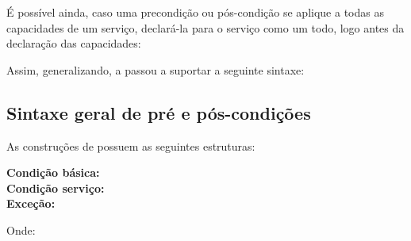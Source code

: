 É possível ainda, caso uma precondição ou pós-condição se aplique a todas as
capacidades de um serviço, declará-la para o serviço como um todo,
logo antes da declaração das capacidades:

\begin{center}
\begin{footnotesize}
\end{footnotesize}
\end{center}

 Assim, generalizando, a \neoidl{} passou a suportar a seguinte sintaxe:
 
\begin{center}
\begin{footnotesize}
\end{footnotesize}
\end{center}
 

\subsection{Sintaxe geral de pré e pós-condições}
\label{TiposContrDbC}

As construções de \designbycontract{} possuem as
seguintes estruturas:

\begin{center}
\begin{footnotesize}
\textbf{Condição básica:}
\\
\vspace{3mm}
\textbf{Condição serviço:}
\\
\vspace{3mm}
\textbf{Exceção:}\\
\end{footnotesize}
\end{center}

Onde:

